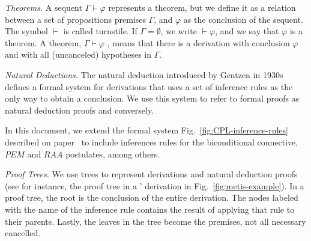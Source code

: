 \documentclass[../main.tex]{subfiles}
\begin{document}
\emph{Theorems.}
A sequent $Γ ⊢ φ$ represents a theorem, but we
define it as a relation between a set of propositions premises $Γ$,
and $φ$ as the conclusion of the sequent.
The symbol $⊢$ is called turnstile.
If $Γ = ∅$, we write $⊢ φ$, and we say that $φ$ is a theorem.
A theorem, $Γ ⊢ φ$ , means that there is a derivation with
conclusion $φ$ and with all (uncanceled) hypotheses in $Γ$.




\emph{Natural Deductions.}
The natural deduction introduced by Gentzen in 1930s defines a formal system
for derivations that uses a set of inference rules as the only way to obtain a
conclusion. We use this system to refer to formal proofs as natural deduction
proofs and conversely.

In this document, we extend the \CPL formal system
Fig.~\ref{fig:CPL-inference-rules} described on
paper~\cite{Altenkirch2015} to include inferences rules for the biconditional
connective, $PEM$ and $RAA$ postulates, among others.


\emph{Proof Trees.} We use trees to represent derivations and
natural deduction proofs (see for instance, the proof tree in a
\Metis' derivation in Fig.~\ref{fig:metis-example}).
In a proof tree, the root is the conclusion of the entire
derivation. The nodes labeled with the name of the inference rule
contains the result of applying that rule to their parents. Lastly,
the leaves in the tree become the premises, not all necessary
cancelled.
\end{document}
